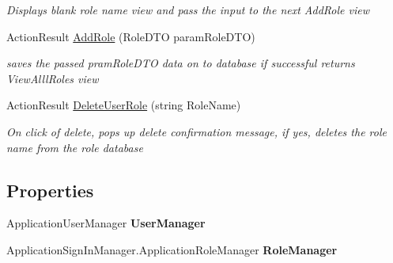 \begin{DoxyCompactItemize}
\begin{DoxyCompactList}\small\item\em Displays blank role name view and pass the input to the next Add\+Role view \end{DoxyCompactList}\item 
Action\+Result \hyperlink{class_alfa_accounting_1_1_controllers_1_1_admin_controller_a3d687320b749a1965076591cac812ef4}{Add\+Role} (Role\+D\+TO param\+Role\+D\+TO)
\begin{DoxyCompactList}\small\item\em saves the passed pram\+Role\+D\+TO data on to database if successful returns View\+Alll\+Roles view \end{DoxyCompactList}\item 
Action\+Result \hyperlink{class_alfa_accounting_1_1_controllers_1_1_admin_controller_affbab160f6a2b99cf1caa77c57ac0bd3}{Delete\+User\+Role} (string Role\+Name)
\begin{DoxyCompactList}\small\item\em On click of delete, pops up delete confirmation message, if yes, deletes the role name from the role database \end{DoxyCompactList}\end{DoxyCompactItemize}
\subsection*{Properties}
\begin{DoxyCompactItemize}
\item 
\mbox{\label{class_alfa_accounting_1_1_controllers_1_1_admin_controller_a8097d4b01a88147e8fe371710977f508}} 
Application\+User\+Manager {\bfseries User\+Manager}
\item 
\mbox{\label{class_alfa_accounting_1_1_controllers_1_1_admin_controller_a0f725433f340d0ee968cf44eb1c8dc76}} 
Application\+Sign\+In\+Manager.\+Application\+Role\+Manager {\bfseries Role\+Manager}
\end{DoxyCompactItemize}
